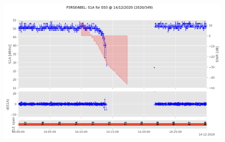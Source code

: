 \begin{enumerate}
\begin{figure}[H]%
\centering%
\includegraphics[width=0.95\linewidth]{png/P3RS04BEL_R_20203490000_01D_00U_MO_E-S1A-E03.png}%
\end{figure}


\end{enumerate}
